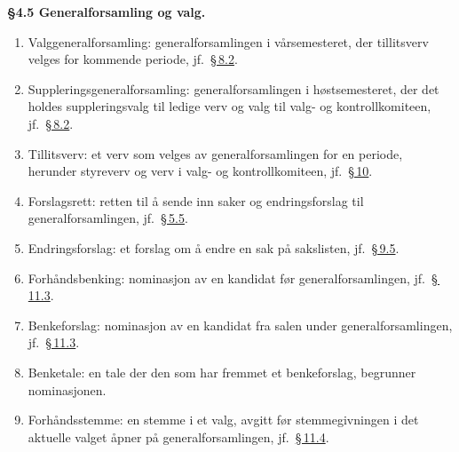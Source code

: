\documentclass{../../../Common/Latex/Templates/rapport}
\begin{document}
\textbf{\S 4.5 Generalforsamling og valg.}\label{nbylaw:4.5}
\begin{enumerate}
  \item Valggeneralforsamling: generalforsamlingen i v\r{a}rsemesteret, der tillitsverv velges for kommende periode, jf.\ \hyperref[nbylaw:8.2]{\S\,8.2}.
  \item Suppleringsgeneralforsamling: generalforsamlingen i høstsemesteret, der det holdes suppleringsvalg til ledige verv og valg til valg- og kontrollkomiteen, jf.\ \hyperref[nbylaw:8.2]{\S\,8.2}.
  \item Tillitsverv: et verv som velges av generalforsamlingen for en periode, herunder styreverv og verv i valg- og kontrollkomiteen, jf.\ \hyperref[nbylaw:10]{\S\,10}.
  \item Forslagsrett: retten til \r{a} sende inn saker og endringsforslag til generalforsamlingen, jf.\ \hyperref[nbylaw:5.5]{\S\,5.5}.
  \item Endringsforslag: et forslag om \r{a} endre en sak p\r{a} sakslisten, jf.\ \hyperref[nbylaw:9.5]{\S\,9.5}.
  \item Forh\r{a}ndsbenking: nominasjon av en kandidat før generalforsamlingen, jf.\ \hyperref[nbylaw:11.3]{\S\,11.3}.
  \item Benkeforslag: nominasjon av en kandidat fra salen under generalforsamlingen, jf.\ \hyperref[nbylaw:11.3]{\S\,11.3}.
  \item Benketale: en tale der den som har fremmet et benkeforslag, begrunner nominasjonen.
  \item Forh\r{a}ndsstemme: en stemme i et valg, avgitt før stemmegivningen i det aktuelle valget \r{a}pner p\r{a} generalforsamlingen, jf.\ \hyperref[nbylaw:11.4]{\S\,11.4}.
\end{enumerate}
\end{document}
